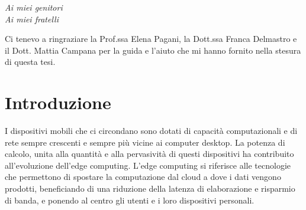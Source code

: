 \documentclass[12pt,italian]{report}
\begin{document}
\frontespizio
\beforepreface

% 
%

{\raggedleft \large \sl Ai miei genitori \\ Ai miei fratelli \\}
         
% 
%


%
%

Ci tenevo a ringraziare la Prof.ssa Elena Pagani, la Dott.ssa Franca Delmastro e il Dott. Mattia Campana per la guida e l'aiuto che mi hanno fornito nella stesura di questa tesi.
%
%

\afterpreface

% 
% 

\chapter{Introduzione}
\label{cap:introduzione}
I dispositivi mobili che ci circondano sono dotati di capacità computazionali e di rete sempre crescenti e sempre più vicine ai computer desktop. La potenza di calcolo, unita alla quantità e alla pervasività di questi dispositivi ha contribuito all'evoluzione dell'edge computing. L'edge computing si riferisce alle tecnologie che permettono di spostare la computazione dal cloud a dove i dati vengono prodotti, beneficiando di una riduzione della latenza di elaborazione e risparmio di banda, e ponendo al centro gli utenti e i loro dispositivi personali.
\end{document}
